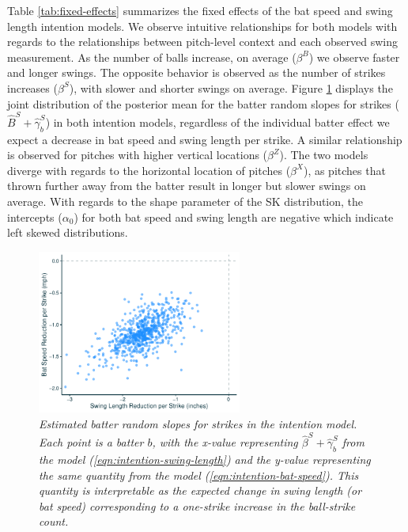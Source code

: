 \documentclass{article}
\begin{document}
       Table \ref{tab:fixed-effects} summarizes the fixed effects of the bat speed and swing length intention models. We observe intuitive relationships for both models with regards to the relationships between pitch-level context and each observed swing measurement. As the number of balls increase, on average ($\beta^B$) we observe faster and longer swings. The opposite behavior is observed as the number of strikes increases ($\beta^S$), with slower and shorter swings on average. Figure \ref{fig:approach} displays the joint distribution of the posterior mean for the batter random slopes for strikes ($\hat{B}^S + \hat{\gamma}_b^S$) in both intention models, regardless of the individual batter effect we expect a decrease in bat speed and swing length per strike. A similar relationship is observed for pitches with higher vertical locations ($\beta^Z$). The two models diverge with regards to the horizontal location of pitches ($\beta^X$), as pitches that thrown further away from the batter result in longer but slower swings on average. With regards to the shape parameter of the SK distribution, the intercepts ($\alpha_0$) for both bat speed and swing length are negative which indicate left skewed distributions.

      \begin{figure}
        \centering
        \includegraphics[width = 0.6\textwidth]{../../figures/approach.pdf}
        \caption{\it Estimated batter random slopes for strikes in the intention model. Each point is a batter $b$, with the x-value representing $\hat\beta^S + \hat\gamma^S_b$ from the model (\ref{eqn:intention-swing-length}) and the y-value representing the same quantity from the model (\ref{eqn:intention-bat-speed}). This quantity is interpretable as the expected change in swing length (or bat speed) corresponding to a one-strike increase in the ball-strike count.}
        \label{fig:approach}
      \end{figure}
\end{document}
